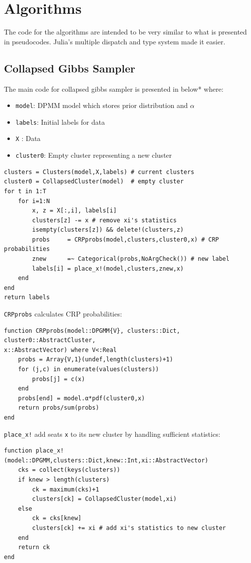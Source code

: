 \documentclass[a4paper]{article}
\begin{document}
\section{Algorithms}

The code for the algorithms are intended to be very similar to what is
presented in pseudocodes. Julia's multiple dispatch and type system made
it easier.


\subsection{Collapsed Gibbs Sampler}

The main code for collapsed gibbs sampler is presented in below* where:

\begin{itemize}
\item
  \texttt{model}: DPMM model which stores prior distribution and
  \(\alpha\) 
\item
  \texttt{labels}: Initial labels for data
\item
  \texttt{X} : Data
\item
  \texttt{cluster0}: Empty cluster representing a new cluster
\end{itemize}
\begin{lstlisting}
clusters = Clusters(model,X,labels) # current clusters
cluster0 = CollapsedCluster(model)  # empty cluster
for t in 1:T
 	for i=1:N
        x, z = X[:,i], labels[i]
        clusters[z] -= x # remove xi's statistics
        isempty(clusters[z]) && delete!(clusters,z)
        probs     = CRPprobs(model,clusters,cluster0,x) # CRP probabilities
        znew      =~ Categorical(probs,NoArgCheck()) # new label
        labels[i] = place_x!(model,clusters,znew,x)
    end
end
return labels
\end{lstlisting}

\texttt{CRPprobs} calculates CRP probabilities:
\begin{lstlisting}
function CRPprobs(model::DPGMM{V}, clusters::Dict, cluster0::AbstractCluster, 
x::AbstractVector) where V<:Real
    probs = Array{V,1}(undef,length(clusters)+1)
    for (j,c) in enumerate(values(clusters))
        probs[j] = c(x)
    end
    probs[end] = model.α*pdf(cluster0,x)
    return probs/sum(probs)
end
\end{lstlisting}
\texttt{place\_x!} add seats \texttt{x} to its new cluster by handling
sufficient statistics:
\begin{lstlisting}
function place_x!(model::DPGMM,clusters::Dict,knew::Int,xi::AbstractVector)
    cks = collect(keys(clusters))
    if knew > length(clusters)
        ck = maximum(cks)+1
        clusters[ck] = CollapsedCluster(model,xi)
    else
        ck = cks[knew]
        clusters[ck] += xi # add xi's statistics to new cluster
    end
    return ck
end
\end{lstlisting}
\end{document}
